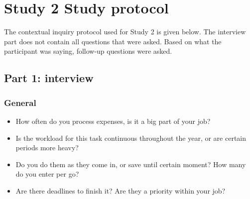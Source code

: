 \chapter{Study 2 Study protocol}\label{ch:S2_Protocol}
The contextual inquiry protocol used for Study 2 is given below. The interview part does not contain all questions that were asked. Based on what the participant was saying, follow-up questions were asked. 

\section{Part 1: interview}
\subsection{General}
\begin{itemize}
\item How often do you process expenses, is it a big part of your job?
\item Is the workload for this task continuous throughout the year, or are certain periods more heavy?
\item Do you do them as they come in, or save until certain moment? How many do you enter per go?
\item Are there deadlines to finish it? Are they a priority within your job?
\end{itemize}

